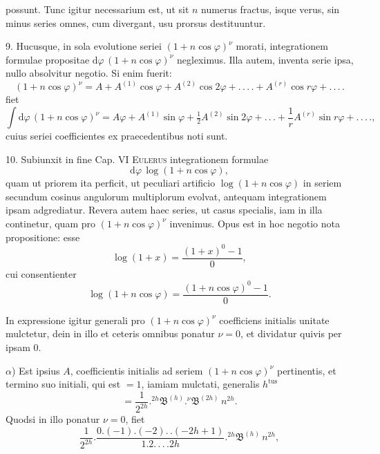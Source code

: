 possunt. Tunc igitur necessarium est, ut sit $n$ numerus fractus, isque verus, sin minus
series omnes, cum divergant, usu prorsus destituuntur.

9. Hucusque, in sola evolutione seriei $(1+n\cos\varphi)^{\nu}$ morati, integrationem formulae
propositae $\mathrm{d}\varphi\,(1+n\cos\varphi)^{\nu}$ negleximus. Illa autem, inventa serie ipsa,
nullo absolvitur negotio. Si enim fuerit:
\[
(1+n\cos\varphi)^{\nu} = A + A^{(1)}\cos\varphi + A^{(2)}\cos 2\varphi + .\,.\,.\,. + A^{(r)}\cos r\varphi + .\,.\,.\,.
\]
fiet
\[
\int \mathrm{d}\varphi\,(1+n\cos\varphi)^{\nu} = A\varphi + A^{(1)}\sin\varphi + \tfrac{1}{2}A^{(2)}\sin 2\varphi + .\,.\,. + \frac{1}{r}A^{(r)}\sin r\varphi + .\,.\,.\,.,
\]
cuius seriei coefficientes ex praecedentibus noti sunt.

10. Subiunxit in fine Cap. VI \textsc{Eulerus} integrationem formulae
\[
\mathrm{d}\varphi\,\log(1+n\cos\varphi),
\]
quam ut priorem ita perficit, ut peculiari artificio $\log(1+n\cos\varphi)$ in seriem secundum
cosinus angulorum multiplorum evolvat, antequam integrationem ipsam adgrediatur. Revera autem
haec series, ut casus specialis, iam in illa continetur, quam pro $(1+n\cos\varphi)^{\nu}$
invenimus. Opus est in hoc negotio nota propositione: esse
\[
\log(1+x) = \frac{(1+x)^{0}-1}{0},
\]
cui consentienter
\[
\log(1+n\cos\varphi) = \frac{(1+n\cos\varphi)^{0}-1}{0}.
\]
\par\noindent\hspace*{\parindent}In expressione igitur generali pro $(1+n\cos\varphi)^{\nu}$ coefficiens initialis unitate
mulctetur, dein in illo et ceteris omnibus ponatur $\nu=0$, et dividatur quivis per ipsam $0$.

$\alpha$) Est ipsius $A$, coefficientis initialis ad seriem $(1+n\cos\varphi)^{\nu}$ pertinentis, et
termino suo initiali, qui est $=1$, iamiam mulctati, generalis $h^{\mathrm{tus}}$
\[
= \frac{1}{2^{2h}} . {}^{2h}\mathfrak{B}^{(h)} . {}^{\nu}\mathfrak{B}^{(2h)}\,n^{2h}.
\]
Quodsi in illo ponatur $\nu=0$, fiet
\[
\frac{1}{2^{2h}} . \frac{0.(-1).(-2).\,.(-2h+1)}{1.2.\,.\,.\,. 2h} . {}^{2h}\mathfrak{B}^{(h)}\,n^{2h},
\]


